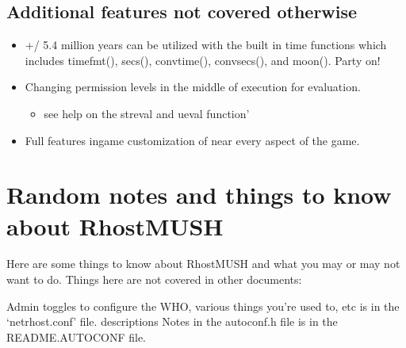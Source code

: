 \documentclass[letterpaper,10pt,english]{sphinxmanual}
\begin{document}
\subsection{Additional features not covered otherwise}
\label{\detokenize{features:additional-features-not-covered-otherwise}}\begin{itemize}
\item {} 
\sphinxAtStartPar
+/\sphinxhyphen{} 5.4 million years can be utilized with the built in time functions
which includes timefmt(), secs(), convtime(), convsecs(), and moon().  Party on!

\item {} 
\sphinxAtStartPar
Changing permission levels in the middle of execution for evaluation.
\begin{itemize}
\item {} 
\sphinxAtStartPar
see help on the streval and ueval function’

\end{itemize}

\item {} 
\sphinxAtStartPar
Full features in\sphinxhyphen{}game customization of near every aspect of the game.

\end{itemize}


\section{Random notes and things to know about RhostMUSH}
\label{\detokenize{features:random-notes-and-things-to-know-about-rhostmush}}
\sphinxAtStartPar
Here are some things to know about RhostMUSH and what you may or may not
want to do.  Things here are not covered in other documents:

\sphinxAtStartPar
Admin toggles to configure the WHO, various things you’re used to, etc is in the
‘netrhost.conf’ file.  descriptions Notes in the autoconf.h file is in the
README.AUTOCONF file.
\end{document}
